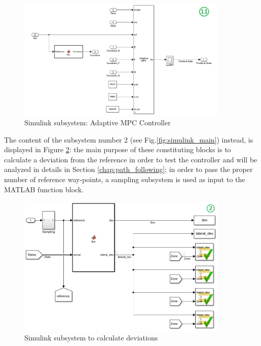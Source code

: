  
 \begin{figure}[H]
    \centering
    \includegraphics[width=0.9\textwidth]{Figures/adaptive_mpc.png}
    \caption{Simulink subsystem: Adaptive MPC Controller}
    \label{fig:adaptive_mpc}
\end{figure}

The content of the subsystem number 2 (see Fig.\ref{fig:simulink_main}) instead, is displayed in Figure \ref{fig:simulink_deviation}: the main purpose of these constituting blocks is to calculate a deviation from the reference in order to test the controller and will be analyzed in details in Section \ref{chap:path_following}; in order to pass the proper number of reference way-points, a sampling subsystem is used as input to the MATLAB function block.
\begin{figure}[H]
    \centering
    \includegraphics[width=0.9\textwidth]{Figures/simulink_deviation.png}
    \caption{Simulink subsystem to calculate deviations}
    \label{fig:simulink_deviation}
\end{figure}
 
